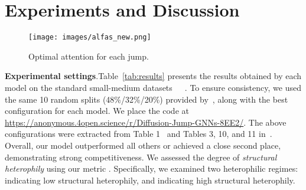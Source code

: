 \documentclass{article}
\theoremstyle{plain}
\theoremstyle{definition}
\begin{document}
\section{Experiments and Discussion}\label{sec:5}
\label{discussion}
\begin{wrapfigure}{r}{0.5\textwidth}
    \centering
    \texttt{[image: images/alfas\_new.png]}
    \caption{Optimal attention for each jump.}
    \label{fig:alfas}
\end{wrapfigure}
\textbf{Experimental settings}.Table~\ref{tab:results} presents the results obtained by each model on the standard small-medium datasets~\citep{Cora}~\citep{GEOM-GCN}~\citep{actor}. To ensure consistency, we used the same 10 random splits (48\%/32\%/20\%) provided by~\citep{GEOM-GCN}, along with the best configuration for each model. We place the code at \url{https://anonymous.4open.science/r/Diffusion-Jump-GNNs-8EE2/}. The above configurations were extracted from Table 1~\citep{GRAFF} and Tables 3, 10, and 11 in~\citep{LINKX21}. Overall, our model outperformed all others or achieved a close second place, demonstrating strong competitiveness. We assessed the degree of \emph{structural heterophily} using our metric . Specifically, we examined two heterophilic regimes:  indicating low structural heterophily, and  indicating high structural heterophily. \\
\end{document}
